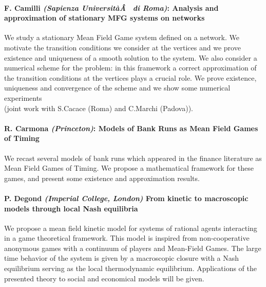 \documentclass[11pt]{article}
\begin{document}
\paragraph{F. Camilli {\sl (Sapienza Universit{\`a}{\^A}   di Roma)}:  Analysis and approximation of   stationary MFG systems  on  networks}
 We study a stationary Mean Field Game system defined on a network.
We  motivate the transition  conditions we consider at the vertices and  we prove 
existence and uniqueness of  a smooth solution to
the system. We also consider  a  numerical scheme  for  the problem: in
  this framework a correct approximation of the transition conditions at the vertices plays a crucial role.
We prove existence, uniqueness and convergence of the scheme and we show some numerical experiments\\
(joint work with S.Cacace (Roma) and C.Marchi (Padova)).

\paragraph{R. Carmona {\sl(Princeton)}: Models of Bank Runs as Mean Field Games of Timing}
We recast several models of bank runs which appeared in the finance literature as Mean Field Games of Timing.
We propose a mathematical framework for these games, and present some existence and approximation results.

 
\paragraph{ P. Degond  {\sl (Imperial College, London)}
  From kinetic to macroscopic models through local Nash equilibria}
 We propose a mean field kinetic model for systems of rational agents
interacting in a game theoretical
framework. This model is inspired from non-cooperative anonymous games with
a continuum of players and Mean-Field Games. The large time behavior of the
system is given by a macroscopic closure with a Nash equilibrium serving as
the local thermodynamic equilibrium. Applications of the presented theory to
social and economical models will be given.
\end{document}
